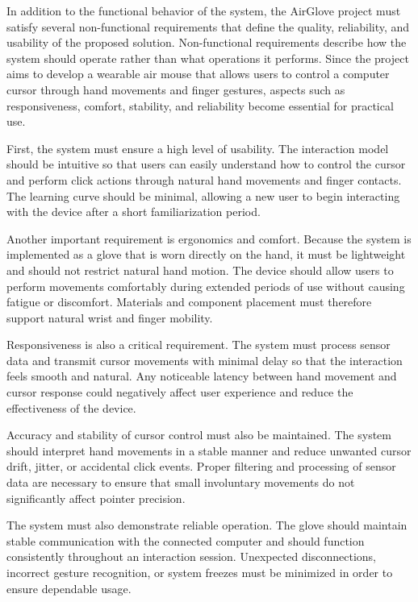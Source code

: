 In addition to the functional behavior of the system, the AirGlove project must satisfy several non-functional requirements that define the quality, reliability, and usability of the proposed solution. Non-functional requirements describe how the system should operate rather than what operations it performs. Since the project aims to develop a wearable air mouse that allows users to control a computer cursor through hand movements and finger gestures, aspects such as responsiveness, comfort, stability, and reliability become essential for practical use.

First, the system must ensure a high level of usability. The interaction model should be intuitive so that users can easily understand how to control the cursor and perform click actions through natural hand movements and finger contacts. The learning curve should be minimal, allowing a new user to begin interacting with the device after a short familiarization period.

Another important requirement is ergonomics and comfort. Because the system is implemented as a glove that is worn directly on the hand, it must be lightweight and should not restrict natural hand motion. The device should allow users to perform movements comfortably during extended periods of use without causing fatigue or discomfort. Materials and component placement must therefore support natural wrist and finger mobility.

Responsiveness is also a critical requirement. The system must process sensor data and transmit cursor movements with minimal delay so that the interaction feels smooth and natural. Any noticeable latency between hand movement and cursor response could negatively affect user experience and reduce the effectiveness of the device.

Accuracy and stability of cursor control must also be maintained. The system should interpret hand movements in a stable manner and reduce unwanted cursor drift, jitter, or accidental click events. Proper filtering and processing of sensor data are necessary to ensure that small involuntary movements do not significantly affect pointer precision.

The system must also demonstrate reliable operation. The glove should maintain stable communication with the connected computer and should function consistently throughout an interaction session. Unexpected disconnections, incorrect gesture recognition, or system freezes must be minimized in order to ensure dependable usage.

